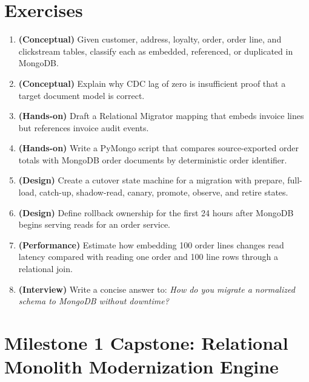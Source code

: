 \section{Exercises}
\begin{enumerate}
    \item \textbf{(Conceptual)} Given customer, address, loyalty, order, order line, and clickstream tables, classify each as embedded, referenced, or duplicated in MongoDB.
    \item \textbf{(Conceptual)} Explain why CDC lag of zero is insufficient proof that a target document model is correct.
    \item \textbf{(Hands-on)} Draft a Relational Migrator mapping that embeds invoice lines but references invoice audit events.
    \item \textbf{(Hands-on)} Write a PyMongo script that compares source-exported order totals with MongoDB order documents by deterministic order identifier.
    \item \textbf{(Design)} Create a cutover state machine for a migration with prepare, full-load, catch-up, shadow-read, canary, promote, observe, and retire states.
    \item \textbf{(Design)} Define rollback ownership for the first 24 hours after MongoDB begins serving reads for an order service.
    \item \textbf{(Performance)} Estimate how embedding 100 order lines changes read latency compared with reading one order and 100 line rows through a relational join.
    \item \textbf{(Interview)} Write a concise answer to: \emph{How do you migrate a normalized schema to MongoDB without downtime?}
\end{enumerate}

\section{Milestone 1 Capstone: Relational Monolith Modernization Engine}\label{sec:ch4-capstone}

